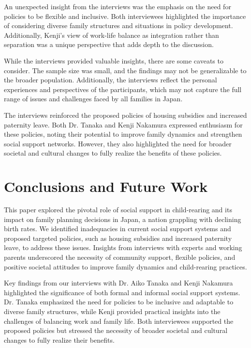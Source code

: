 \documentclass{article} %
\begin{document}
An unexpected insight from the interviews was the emphasis on the need for policies to be flexible and inclusive. Both interviewees highlighted the importance of considering diverse family structures and situations in policy development. Additionally, Kenji's view of work-life balance as integration rather than separation was a unique perspective that adds depth to the discussion.

While the interviews provided valuable insights, there are some caveats to consider. The sample size was small, and the findings may not be generalizable to the broader population. Additionally, the interviews reflect the personal experiences and perspectives of the participants, which may not capture the full range of issues and challenges faced by all families in Japan.

The interviews reinforced the proposed policies of housing subsidies and increased paternity leave. Both Dr. Tanaka and Kenji Nakamura expressed enthusiasm for these policies, noting their potential to improve family dynamics and strengthen social support networks. However, they also highlighted the need for broader societal and cultural changes to fully realize the benefits of these policies.

\section{Conclusions and Future Work}
\label{sec:conclusion}

This paper explored the pivotal role of social support in child-rearing and its impact on family planning decisions in Japan, a nation grappling with declining birth rates. We identified inadequacies in current social support systems and proposed targeted policies, such as housing subsidies and increased paternity leave, to address these issues. Insights from interviews with experts and working parents underscored the necessity of community support, flexible policies, and positive societal attitudes to improve family dynamics and child-rearing practices.

Key findings from our interviews with Dr. Aiko Tanaka and Kenji Nakamura highlighted the significance of both formal and informal social support systems. Dr. Tanaka emphasized the need for policies to be inclusive and adaptable to diverse family structures, while Kenji provided practical insights into the challenges of balancing work and family life. Both interviewees supported the proposed policies but stressed the necessity of broader societal and cultural changes to fully realize their benefits.
\end{document}
